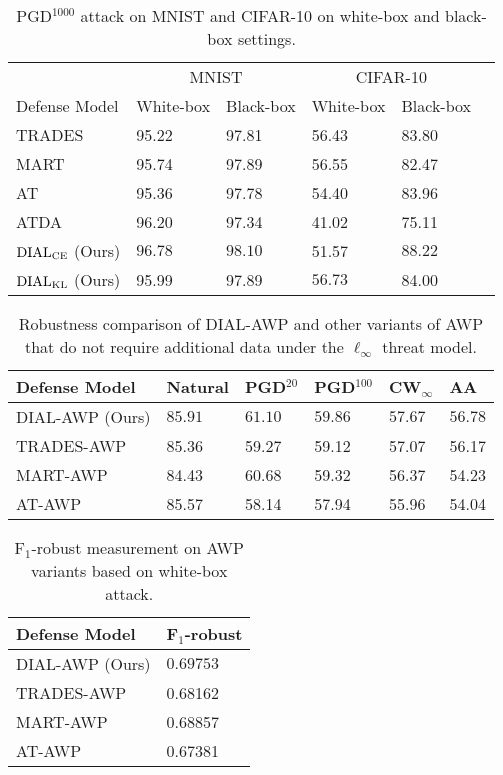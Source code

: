 \begin{table}[!ht]
  \caption{PGD$^{1000}$ attack on MNIST and CIFAR-10 on white-box and black-box settings.}
  \label{pgd1000_attack}
  \vskip 0.15in
  \centering
  \begin{tabular}{llllll}
    \toprule
    & \multicolumn{2}{c}{MNIST} & \multicolumn{2}{c}{CIFAR-10} \\
    \cmidrule(r){2-3} 
    \cmidrule(r){4-5}
    Defense Model & White-box & Black-box & White-box & Black-box  \\
    \midrule
    TRADES & 95.22 & 97.81 & 56.43 & 83.80 \\
    MART & 95.74 & 97.89 & 56.55 & 82.47 \\
    AT & 95.36 & 97.78 & 54.40 & 83.96 \\
    ATDA & 96.20 & 97.34 & 41.02 & 75.11 \\
    $\operatorname{DIAL}_{\operatorname{CE}}$ (Ours) &  $\mathbf{96.78}$ & $\mathbf{98.10}$  & 51.57 & $\mathbf{88.22}$  \\
    $\operatorname{DIAL}_{\operatorname{KL}}$ (Ours) & 95.99 & 97.89 & $\mathbf{56.73}$ & 84.00 \\
    \bottomrule
  \end{tabular}
\end{table}


\begin{table}[!ht]
  \caption{Robustness comparison of DIAL-AWP and other variants of AWP that do not require additional data under the $\ell_{\infty}$ threat model.}
  \label{awp_variants}
  \vskip 0.15in
  \centering
  \begin{tabular}{lllll|l}
    \toprule
    \cmidrule(r){1-5}
    Defense Model & Natural & PGD$^{20}$ & PGD$^{100}$ & CW$_{\infty}$ & AA\\
    \midrule
    DIAL-AWP (Ours) & $\mathbf{85.91}$ & $\mathbf{61.10}$ & $\mathbf{59.86}$ & $\mathbf{57.67}$ & $\mathbf{56.78}$  \\
    TRADES-AWP \citep{wu2020adversarial} & 85.36 & 59.27 & 59.12 & 57.07 & 56.17    \\
    MART-AWP \citep{wu2020adversarial} & 84.43 & 60.68 & 59.32 & 56.37 & 54.23  \\
    AT-AWP \citep{wu2020adversarial} & 85.57  &  58.14 & 57.94 & 55.96 & 54.04 \\
    \bottomrule
  \end{tabular}
\end{table}

\begin{table}[!ht]
  \caption{F$_{1}$-robust measurement on AWP variants based on white-box attack.}
  \label{f1-awp}
  \vskip 0.15in
  \centering
  \begin{tabular}{ll}
    \toprule
    \cmidrule(r){1-2}
    Defense Model & F$_{1}$-robust \\
    \midrule
    DIAL-AWP (Ours) & $\mathbf{0.69753}$  \\
    TRADES-AWP \citep{wu2020adversarial} & 0.68162   \\
    MART-AWP \citep{wu2020adversarial} & 0.68857  \\
    AT-AWP \citep{wu2020adversarial} & 0.67381 \\
    \bottomrule
  \end{tabular}
\end{table}

